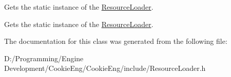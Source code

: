 Gets the static instance of the \hyperlink{class_cookie_eng_1_1_res_mgmt_1_1_resource_loader}{Resource\+Loader}. 

Gets the static instance of the \hyperlink{class_cookie_eng_1_1_res_mgmt_1_1_resource_loader}{Resource\+Loader}. 

The documentation for this class was generated from the following file\+:\begin{DoxyCompactItemize}
\item 
D\+:/\+Programming/\+Engine Development/\+Cookie\+Eng/\+Cookie\+Eng/include/Resource\+Loader.\+h\end{DoxyCompactItemize}
